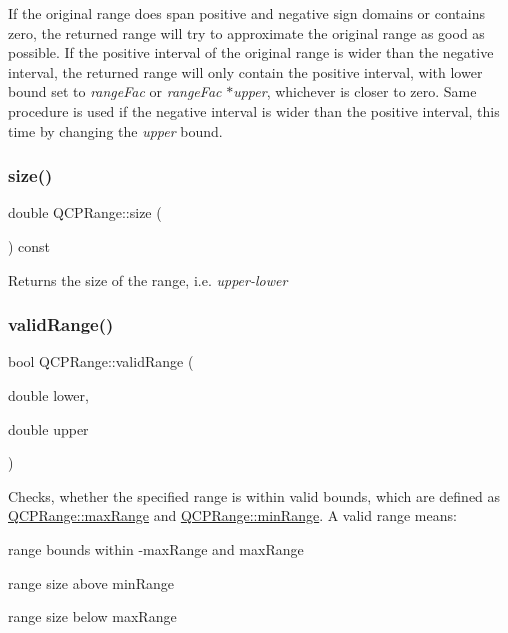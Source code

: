 If the original range does span positive and negative sign domains or contains zero, the returned range will try to approximate the original range as good as possible. If the positive interval of the original range is wider than the negative interval, the returned range will only contain the positive interval, with lower bound set to {\itshape range\+Fac} or {\itshape range\+Fac} $\ast${\itshape upper}, whichever is closer to zero. Same procedure is used if the negative interval is wider than the positive interval, this time by changing the {\itshape upper} bound. \mbox{\label{class_q_c_p_range_a62326e7cc4316b96df6a60813230e63f}} 
\subsubsection{\texorpdfstring{size()}{size()}}
{\footnotesize\ttfamily double Q\+C\+P\+Range\+::size (\begin{DoxyParamCaption}{ }\end{DoxyParamCaption}) const\hspace{0.3cm}{\ttfamily [inline]}}

Returns the size of the range, i.\+e. {\itshape upper-\/{\itshape lower} } \mbox{\label{class_q_c_p_range_ab38bd4841c77c7bb86c9eea0f142dcc0}} 
\subsubsection{\texorpdfstring{validRange()}{validRange()}\hspace{0.1cm}{\footnotesize\ttfamily [1/2]}}
{\footnotesize\ttfamily bool Q\+C\+P\+Range\+::valid\+Range (\begin{DoxyParamCaption}\item[{double}]{lower,  }\item[{double}]{upper }\end{DoxyParamCaption})\hspace{0.3cm}{\ttfamily [static]}}

Checks, whether the specified range is within valid bounds, which are defined as \mbox{\hyperlink{class_q_c_p_range_a5ca51e7a2dc5dc0d49527ab171fe1f4f}{Q\+C\+P\+Range\+::max\+Range}} and \mbox{\hyperlink{class_q_c_p_range_ab46d3bc95030ee25efda41b89e2b616b}{Q\+C\+P\+Range\+::min\+Range}}. A valid range means\+: \begin{DoxyItemize}
\item range bounds within -\/max\+Range and max\+Range \item range size above min\+Range \item range size below max\+Range \end{DoxyItemize}
\mbox{\label{class_q_c_p_range_a801b964752eaad6219be9d8a651ec2b3}} 
